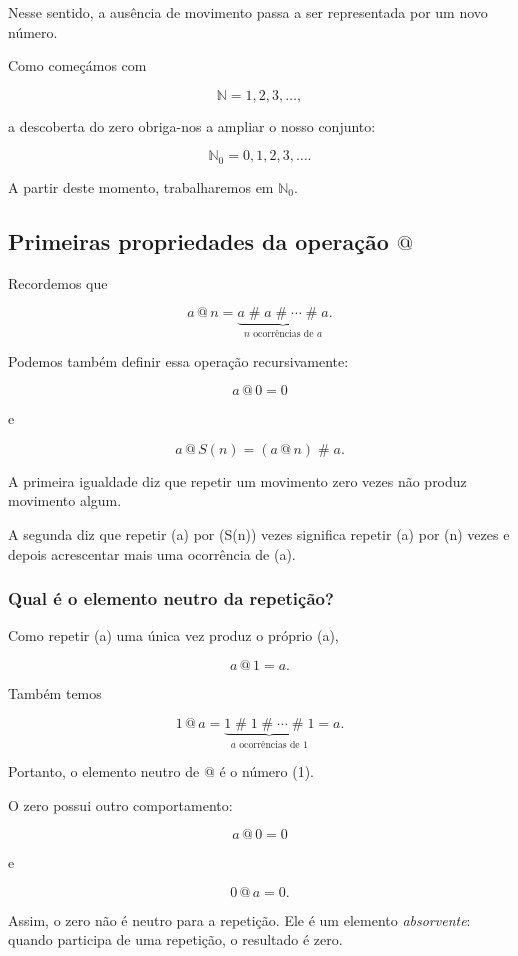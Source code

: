\documentclass[12pt,a4paper]{article}
\makeatletter
\newcommand{\mov}{\mathbin{\#}}
\newcommand{\rep}{\mathbin{@}}
\makeatother
\begin{document}
Nesse sentido, a ausência de movimento passa a ser representada por um
novo número.

Como começámos com

\[
\mathbb{N}={1,2,3,\ldots},
\]

a descoberta do zero obriga-nos a ampliar o nosso conjunto:

\[
\mathbb{N}_0={0,1,2,3,\ldots}.
\]

A partir deste momento, trabalharemos em $\mathbb{N}_0$.

\subsection{Primeiras propriedades da operação \texorpdfstring{$\rep$}{@}}

Recordemos que

\[
a\rep n
=
\underbrace{a\mov a\mov\cdots\mov a}
_{n\text{ ocorrências de }a}.
\]

Podemos também definir essa operação recursivamente:

\[
a\rep0=0
\]

e

\[
a\rep S(n)=(a\rep n)\mov a.
\]

A primeira igualdade diz que repetir um movimento zero vezes não produz
movimento algum.

A segunda diz que repetir (a) por (S(n)) vezes significa repetir
(a) por (n) vezes e depois acrescentar mais uma ocorrência de (a).

\subsubsection{Qual é o elemento neutro da repetição?}

Como repetir (a) uma única vez produz o próprio (a),

\[
a\rep1=a.
\]

Também temos

\[
1\rep a
=
\underbrace{1\mov1\mov\cdots\mov1}
_{a\text{ ocorrências de }1}
=
a.
\]

Portanto, o elemento neutro de $\rep$ é o número (1).

O zero possui outro comportamento:

\[
a\rep0=0
\]

e

\[
0\rep a=0.
\]

Assim, o zero não é neutro para a repetição. Ele é um elemento
\emph{absorvente}: quando participa de uma repetição, o resultado é
zero.
\end{document}
